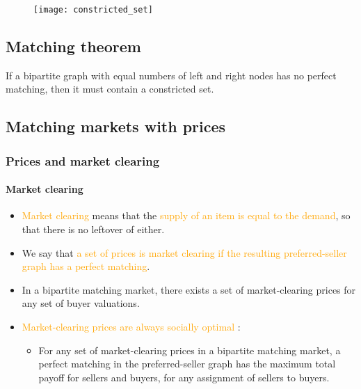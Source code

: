 \begin{figure}[H]
    \centering
    \texttt{[image: constricted\_set]}
\end{figure}

\subsection{Matching theorem}

\begin{formal}
If a bipartite graph with equal numbers of left and right nodes has no perfect matching, then it must contain a constricted set.
\end{formal}

\newpage
\subsection{Matching markets with prices}

\subsubsection{Prices and market clearing}

\paragraph{Market clearing}

\begin{itemize}
\item \textcolor{orange}{Market clearing} means that the \textcolor{orange}{supply of an item is equal to the demand}, so that there is no leftover of either.
\item We say that \textcolor{orange}{a set of prices is market clearing if the resulting preferred-seller graph has a perfect matching}.
\item In a bipartite matching market, there exists a set of market-clearing prices for any set of buyer valuations.
\item \textcolor{orange}{Market-clearing prices are always socially optimal} :
	\begin{itemize}
	\item For any set of market-clearing prices in a bipartite matching market, a perfect matching in the preferred-seller graph has the maximum total payoff for sellers and buyers, for any assignment of sellers to buyers.
	\end{itemize}
\end{itemize}

